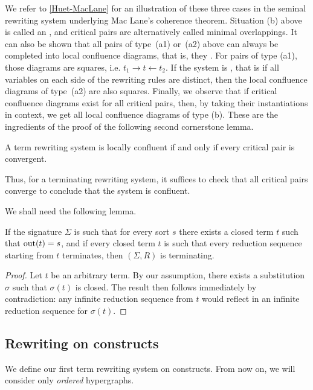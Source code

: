 We refer to \cref{Huet-MacLane} for an illustration of these three cases in the seminal rewriting system underlying Mac Lane's coherence theorem.
Situation (b) above is called an , and critical pairs are alternatively called minimal overlappings.
It can also be shown that all pairs of type~(a1) or~(a2) above can always be completed into local confluence diagrams, that is, they . 
For pairs of type (a1), those  diagrams are squares, i.e. $t_1 \to t \leftarrow t_2$. 
If the system is , that is if all variables on each side of the rewriting rules are distinct, then the local confluence diagrams of type~(a2) are also squares.
Finally, we observe that if critical confluence diagrams exist for all critical pairs, then, by taking their instantiations in context, we get all local confluence diagrams of type (b).  These are the ingredients of the proof of the following second cornerstone lemma.

\begin{lemma}
  \label{l:local-confluence-critical-pair}
  A term rewriting system is locally confluent if and only if every critical pair is convergent. 
\end{lemma}

Thus, for a terminating rewriting system, it suffices to check that all critical pairs converge to conclude that the system is confluent. 

\smallskip
We shall need the following lemma.

\begin{lemma} \label{closed-termination}
If the signature $\Sigma$ is such that for every sort $s$ there exists a closed term $t$ such that $\mathrm{out}(t)=s$, and if  every closed term $t$ is such that every reduction sequence starting from $t$ terminates, then $(\Sigma,R)$ is terminating.
\end{lemma}
\begin{proof} 
Let $t$ be an arbitrary term. By our assumption, there exists a substitution $\sigma$ such that $\sigma(t)$ is closed. 
The result then follows immediately by contradiction: any infinite reduction sequence from 
$t$ would reflect in an infinite reduction sequence for $\sigma(t)$.
\end{proof}



\subsection{Rewriting on constructs}
\label{ss:rewriting-constructs}
We define our first term rewriting system on constructs. 
From now on, we will consider only \emph{ordered} hypergraphs.

